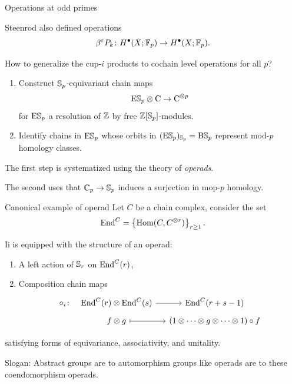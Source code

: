 \documentclass[10pt,t]{beamer} %
\begin{document}
\begin{frame}{Operations at odd primes}

	Steenrod also defined operations
	\[
	\beta^{\varepsilon} P_k \colon H^\bullet(X; \Fp) \to H^\bullet(X; \Fp).
	\]

	\pause How to generalize the cup-$i$ products to cochain level operations for all $p$?

	\smallskip \pause
	\begin{enumerate}
		\item Construct $\S_p$-equivariant chain maps
		\[
		\rE \S_p \otimes \gchains \to \gchains^{\otimes p}
		\]
		for $\rE \S_p$ a resolution of $\Z$ by free $\Z[\S_p]$-modules.
		\vspace*{10pt} \pause
		\item Identify chains in $\rE \S_p$ whose orbits in $(\rE \S_p)_{\S_p} = \rB \S_p$ represent mod-$p$ homology classes.
	\end{enumerate}

	\medskip \pause	The first step is systematized using the theory of \textit{operads}.

	\smallskip \pause The second uses that $\bC_p \to \S_p$ induces a surjection in mop-$p$ homology.
\end{frame}

\begin{frame}[fragile]{Canonical example of operad}
	\pause Let $C$ be a chain complex, consider the set
	\[
	\End^C = \left\{ \Hom(C, C^{\otimes r}) \right\}_{r \geq 1}.
	\]

	\pause	Ii is equipped with the structure of an operad:
	\begin{enumerate}
		\item A left action of $\S_r$ on $\End^C(r)$, \pause
		\item Composition chain maps
		\[
		\begin{tikzcd}[column sep=small, row sep=tiny]
		\circ_i \colon &[-10pt] \End^C(r) \otimes \End^C(s) \arrow[r] & \End^C(r+s-1) \\
		& f \otimes g \arrow[r, |->] & (1 \otimes \cdots \otimes g \otimes \cdots \otimes 1) \circ f
		\end{tikzcd}
		\]
	\end{enumerate}
	satisfying forms of equivariance, associativity, and unitality.

	\pause \vspace*{10pt}

	\textcolor{pblue}{Slogan:} Abstract groups are to automorphism groups like operads are to these coendomorphism operads.
\end{frame}
\end{document}
